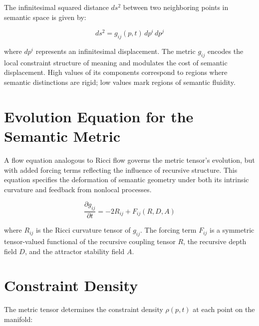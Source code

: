 The infinitesimal squared distance \(ds^2\) between two neighboring points in semantic space is given by:

\begin{equation}
ds^2 = g_{ij}(p, t) \, dp^i \, dp^j
\end{equation}

where \(dp^i\) represents an infinitesimal displacement. The metric \(g_{ij}\) encodes the local constraint structure of meaning and modulates the cost of semantic displacement. High values of its components correspond to regions where semantic distinctions are rigid; low values mark regions of semantic fluidity.


\section{Evolution Equation for the Semantic Metric}
\label{3.3:evolution_equation_for_the_semantic_metric}

A flow equation analogous to Ricci flow \autocite{Hamilton1982, Perelman2002, RicciLeviCivita1901} governs the metric tensor's evolution, but with added forcing terms reflecting the influence of recursive structure. This equation specifies the deformation of semantic geometry under both its intrinsic curvature and feedback from nonlocal processes.

\begin{equation}\label{eq:metric_evolution}
\frac{\partial g_{ij}}{\partial t} = -2 R_{ij} + F_{ij}(R, D, A)
\end{equation}

where \(R_{ij}\) is the Ricci curvature tensor of \(g_{ij}\). The forcing term \(F_{ij}\) is a symmetric tensor-valued functional of the recursive coupling tensor \(R\), the recursive depth field \(D\), and the attractor stability field \(A\).


\section{Constraint Density}
\label{3.4:constraint_density}

The metric tensor determines the constraint density \(\rho(p, t)\) at each point on the manifold:

